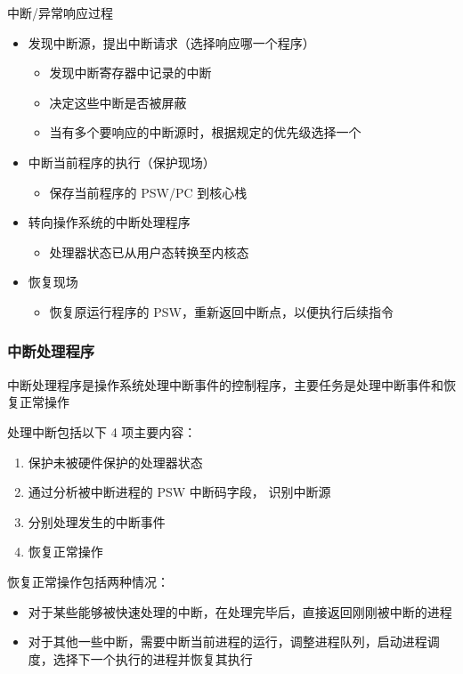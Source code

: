 \documentclass[cs4size,a4paper,10pt]{ctexart}
\begin{document}
	中断/异常响应过程
	\begin{itemize}
		\item 发现中断源，提出中断请求（选择响应哪一个程序）
		\begin{itemize}
			\item 发现中断寄存器中记录的中断
			\item 决定这些中断是否被屏蔽
			\item 当有多个要响应的中断源时，根据规定的优先级选择一个
		\end{itemize}
		\item 中断当前程序的执行（保护现场）
		\begin{itemize}
			\item 保存当前程序的 PSW/PC 到核心栈
		\end{itemize}
		\item 转向操作系统的中断处理程序
		\begin{itemize}
			\item 处理器状态已从用户态转换至内核态
		\end{itemize}
		\item 恢复现场
		\begin{itemize}
			\item 恢复原运行程序的 PSW，重新返回中断点，以便执行后续指令
		\end{itemize}
	\end{itemize}


	\subsubsection{中断处理程序}
	中断处理程序是操作系统处理中断事件的控制程序，主要任务是处理中断事件和恢复正常操作

	处理中断包括以下 4 项主要内容：
	\begin{enumerate}[label=\arabic*.]
		\item 保护未被硬件保护的处理器状态
		\item 通过分析被中断进程的 PSW 中断码字段， 识别中断源
		\item 分别处理发生的中断事件
		\item 恢复正常操作
	\end{enumerate}

	恢复正常操作包括两种情况：
	\begin{itemize}
		\item 对于某些能够被快速处理的中断，在处理完毕后，直接返回刚刚被中断的进程
		\item 对于其他一些中断，需要中断当前进程的运行，调整进程队列，启动进程调度，选择下一个执行的进程并恢复其执行
	\end{itemize}
\end{document}
